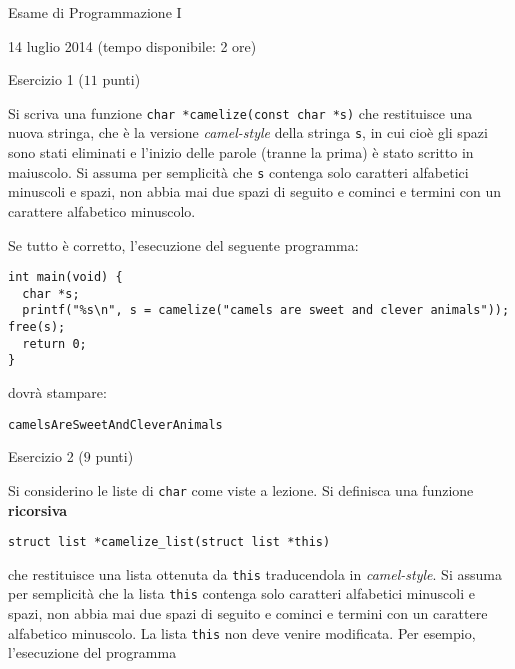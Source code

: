\documentclass[12pt]{article}
\begin{document}
\begin{center}{\LARGE Esame di Programmazione I}\\
\vspace*{-2ex}
\begin{center}
  \large 14 luglio 2014 (tempo disponibile: 2 ore)
\end{center}
\end{center}
\begin{center}{\Large Esercizio 1} ($11$ punti)
\end{center}
Si scriva una funzione \texttt{char *camelize(const char *s)}
che restituisce una nuova stringa, che \`e la versione
\emph{camel-style} della stringa \texttt{s}, in cui cio\`e gli spazi
sono stati eliminati e l'inizio delle parole (tranne la prima) \`e
stato scritto in maiuscolo. Si assuma per semplicit\`a che
\texttt{s} contenga solo caratteri alfabetici minuscoli e spazi, non abbia
mai due spazi di seguito e cominci e termini con un carattere alfabetico minuscolo.

Se tutto \`e corretto, l'esecuzione del seguente programma:

{\small
\begin{verbatim}
int main(void) {
  char *s;
  printf("%s\n", s = camelize("camels are sweet and clever animals")); free(s);
  return 0;
}
\end{verbatim}}

\noindent
dovr\`a stampare:
%
{\small
\begin{verbatim}
camelsAreSweetAndCleverAnimals
\end{verbatim}}

\vspace*{1ex}
\begin{center}{\Large Esercizio 2} ($9$ punti)\end{center}
%
Si considerino le liste di \texttt{char} come viste a lezione. Si definisca una funzione
\textbf{ricorsiva}
%
\begin{verbatim}
struct list *camelize_list(struct list *this)
\end{verbatim}
%
che restituisce una lista ottenuta da \texttt{this} traducendola in \emph{camel-style}. Si assuma
per semplicit\`a che la lista \texttt{this} contenga
solo caratteri alfabetici minuscoli e spazi, non abbia
mai due spazi di seguito e cominci e termini con un carattere alfabetico minuscolo.
La lista \texttt{this} non deve venire modificata. Per esempio, l'esecuzione del programma
\end{document}
